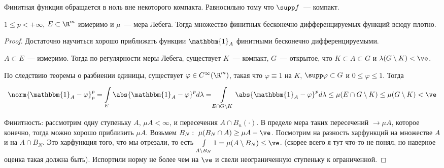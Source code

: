 \begin{definition}
    Финитная функция обращается в ноль вне некоторого компакта.
    Равносильно тому что $\supp f$~--- компакт.
\end{definition}

\begin{theorem}
    $1 \le p < +\infty$, $E \subset \R^m$ измеримо и $\mu$~--- мера Лебега.
    Тогда множество финитных бесконечно дифференцируемых функций всюду плотно.
\end{theorem}

\begin{proof}
    Достаточно научиться хорошо приближать функции $\mathbbm{1}_A$
    финитными бесконечно дифференцируемыми.

    $A \subset E$~--- измеримо. Тогда по регулярности меры Лебега,
    существует $K$~--- компакт, $G$~--- открытое, что $K \subset A \subset G$
    и $\lambda(G \setminus K) < \ve$.

    По следствию теоремы о разбиении единицы,
    существует $\varphi \in C^\infty(\R^m)$, такая что
    $\varphi \equiv 1$ на $K$, $\supp \varphi \subset G$ и
    $0 \le \varphi \le 1$. Тогда

    \[
        \norm{\mathbbm{1}_A - \varphi}^p_p = \int\limits_E \abs{\mathbbm{1}_A
            - \varphi}^p d\lambda =
        \int\limits_{E \cap G\setminus K} \abs{\mathbbm{1}_A -
            \varphi}^p d\lambda \le \mu(E \cap G\setminus K) \le
        \mu(G \setminus K) < \ve
    \]


    Финитность:
    рассмотрим одну ступеньку $A$, $\mu A < \infty$, и пересечения $A \cap B_n(\cdot)$.
    В пределе мера таких пересечений $\to \mu A$, которое конечно, тогда можно хорошо приблизить $\mu A$.
    Возьмем $B_N:\ \mu (B_N \cap A) \geq \mu A - \ve$.
    Посмотрим на разность харфункций на множестве $A$ и на $A \cap B_N$.
    Это харфункция того, что мы отрезали, то есть $\int\limits_{A \setminus B_N} 1 = \mu (A\setminus B_N) \leq \ve$. (скорее всего я тут что-то не понял, но наверное оценка такая должна быть).
    Испортили норму не более чем на $\ve$ и свели неограниченную ступеньку к ограниченной.
\end{proof}

